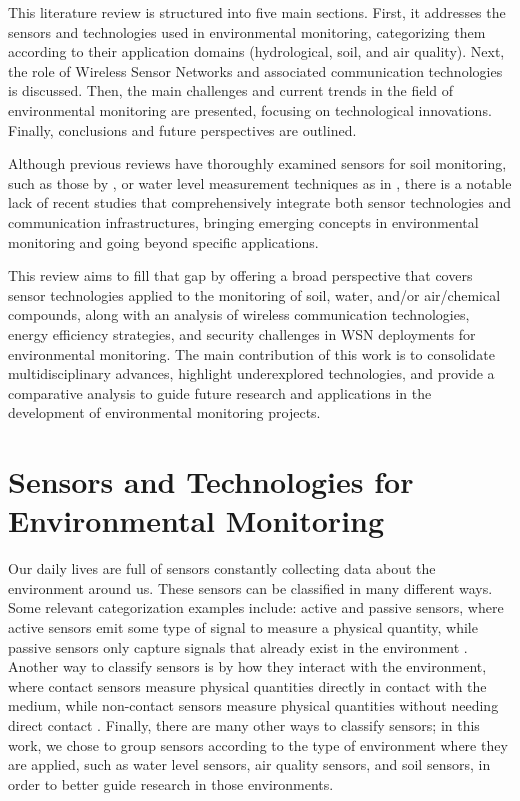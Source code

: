 \documentclass[conference]{IEEEtran}
\begin{document}
This literature review is structured into five main sections. First, it addresses the sensors and technologies used in environmental monitoring, categorizing them according to their application domains (hydrological, soil, and air quality). Next, the role of Wireless Sensor Networks and associated communication technologies is discussed. Then, the main challenges and current trends in the field of environmental monitoring are presented, focusing on technological innovations. Finally, conclusions and future perspectives are outlined.

Although previous reviews have thoroughly examined sensors for soil monitoring, such as those by \cite{yin_2021_smart, teng_2014_soil, queiroz_2020_sensors}, or water level measurement techniques as in \cite{mohindru_2023_development, nr_2025_ai, wu_2023_a}, there is a notable lack of recent studies that comprehensively integrate both sensor technologies and communication infrastructures, bringing emerging concepts in environmental monitoring and going beyond specific applications.

This review aims to fill that gap by offering a broad perspective that covers sensor technologies applied to the monitoring of soil, water, and/or air/chemical compounds, along with an analysis of wireless communication technologies, energy efficiency strategies, and security challenges in WSN deployments for environmental monitoring. The main contribution of this work is to consolidate multidisciplinary advances, highlight underexplored technologies, and provide a comparative analysis to guide future research and applications in the development of environmental monitoring projects.

\section{Sensors and Technologies for Environmental Monitoring} \label{cap:sensors}

Our daily lives are full of sensors constantly collecting data about the environment around us. These sensors can be classified in many different ways. Some relevant categorization examples include: active and passive sensors, where active sensors emit some type of signal to measure a physical quantity, while passive sensors only capture signals that already exist in the environment \cite{javaid_2021_sensors}. Another way to classify sensors is by how they interact with the environment, where contact sensors measure physical quantities directly in contact with the medium, while non-contact sensors measure physical quantities without needing direct contact \cite{javaid_2021_sensors, mohindru_2023_development, wu_2023_a}. Finally, there are many other ways to classify sensors; in this work, we chose to group sensors according to the type of environment where they are applied, such as water level sensors, air quality sensors, and soil sensors, in order to better guide research in those environments.
\end{document}
